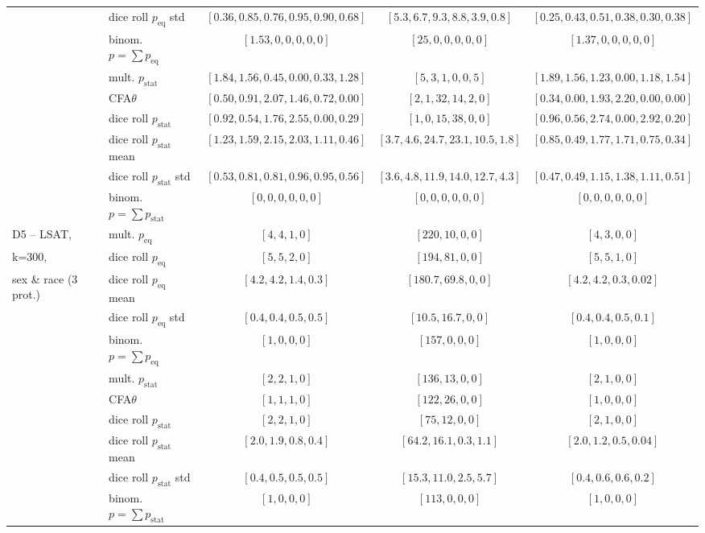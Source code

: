 \begin{table}[t!]
{\begin{tabular}{llccc}
			& dice roll $p_{\text{eq}}$ std	& $[0.36, 0.85, 0.76, 0.95, 0.90, 0.68]$ & $[5.3, 6.7, 9.3, 8.8, 3.9, 0.8]$ 	& $[0.25, 0.43, 0.51, 0.38, 0.30, 0.38]$ \\
			& binom. \algoFAIR $p = \sum p_{\text{eq}}$	& $[1.53,0,0, 0,0,0]$		& $[25,0,0, 0,0,0]$		& $[1.37,0,0, 0,0,0]$  \\
			\cline{2-5}
			& mult. \algoFAIR $p_{\text{stat}}$ & $[1.84, 1.56, 0.45, 0.00, 0.33, 1.28]$ & $[5, 3, 1, 0, 0, 5]$ & $[1.89, 1.56, 1.23, 0.00, 1.18, 1.54]$  \\
			& CFA$\theta$ &  $[0.50, 0.91, 2.07, 1.46, 0.72, 0.00]$ & $[2, 1, 32, 14, 2, 0]$ & $[0.34, 0.00, 1.93, 2.20, 0.00, 0.00]$ \\
			& dice roll $p_{\text{stat}}$ 	& $[0.92, 0.54, 1.76, 2.55, 0.00, 0.29]$ & $[1, 0, 15, 38, 0, 0]$ 		& $[0.96, 0.56, 2.74, 0.00, 2.92, 0.20]$ \\
			& dice roll $p_{\text{stat}}$ mean	& $[1.23, 1.59, 2.15, 2.03, 1.11, 0.46]$ & $[3.7, 4.6, 24.7, 23.1, 10.5, 1.8]$ 		& $[0.85, 0.49, 1.77, 1.71, 0.75, 0.34]$ \\
			& dice roll $p_{\text{stat}}$ std	& $[0.53, 0.81, 0.81, 0.96, 0.95, 0.56]$ & $[3.6, 4.8, 11.9, 14.0, 12.7, 4.3]$ 		& $[0.47, 0.49, 1.15, 1.38, 1.11, 0.51]$ \\
			& binom. \algoFAIR $p = \sum p_{\text{stat}}$	& $[0,0,0, 0,0,0]$		& $[0,0,0, 0,0,0]$	& $[0,0,0, 0,0,0]$ 	 \\	
			\midrule
			\midrule
			D5 -- LSAT, 			& mult. \algoFAIR $p_{\text{eq}}$ 	& $[4, 4, 1, 0]$	& $[220, 10, 0, 0]$ & $[4, 3, 0, 0]$  \\
			k=300, 					& dice roll $p_{\text{eq}}$ 	& $[5, 5, 2, 0]$ & $[194, 81, 0, 0]$ 	& $[5, 5, 1, 0]$ \\
			sex \& race (3 prot.)	& dice roll $p_{\text{eq}}$ mean 	& $[4.2, 4.2, 1.4, 0.3]$ & $[180.7, 69.8, 0, 0]$ 	& $[4.2, 4.2, 0.3, 0.02]$ \\
			& dice roll $p_{\text{eq}}$ std	& $[0.4, 0.4, 0.5, 0.5]$ & $[10.5, 16.7, 0, 0]$ 	& $[0.4, 0.4, 0.5, 0.1]$ \\
			& binom. \algoFAIR $p = \sum p_{\text{eq}}$	& $[1,0,0, 0]$		& $[157,0,0, 0]$		& $[1,0,0, 0]$  \\
			\cline{2-5}
			& mult. \algoFAIR $p_{\text{stat}}$ 	& $[2, 2, 1, 0]$ 	& $[136, 13, 0, 0]$ & $[2, 1, 0, 0]$  \\
			& CFA$\theta$ 					& $[1, 1, 1, 0]$ 	& $[122, 26, 0, 0]$ & $[1, 0, 0, 0]$  \\
			& dice roll $p_{\text{stat}}$ 	& $[2, 2, 1, 0]$ & $[75, 12, 0, 0]$ 	& $[2, 1, 0, 0]$ \\
			& dice roll $p_{\text{stat}}$ mean	& $[2.0, 1.9, 0.8, 0.4]$ & $[64.2, 16.1, 0.3, 1.1]$ 	& $[2.0, 1.2, 0.5, 0.04]$ \\
			& dice roll $p_{\text{stat}}$ std	& $[0.4, 0.5, 0.5, 0.5]$ & $[15.3, 11.0, 2.5, 5.7]$ 	& $[0.4, 0.6, 0.6, 0.2]$ \\
			& binom. \algoFAIR $p = \sum p_{\text{stat}}$	& $[1,0,0, 0]$		& $[113,0,0, 0]$		& $[1,0,0, 0]$ 	 \\													
			\bottomrule
		\end{tabular}
	}
\end{table}
